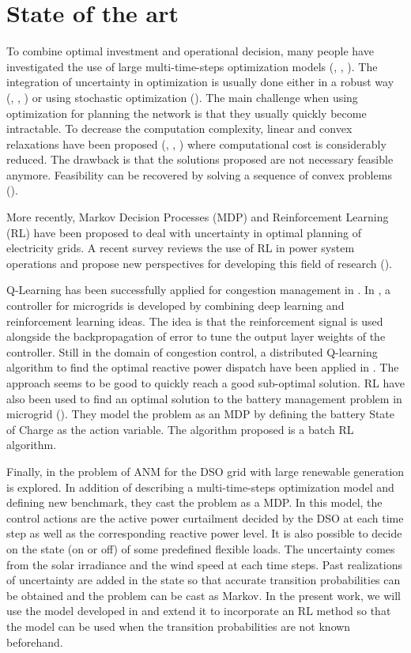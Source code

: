 \section{State of the art}
\label{sec:stateart}

To combine optimal investment and operational decision, many people have investigated the use of large multi-time-steps optimization models (\cite{zonal_int}, \cite{Baker2012OptimalIO}, \cite{paolone}).
The integration of uncertainty in optimization is usually done either in a robust way (\cite{LorcaSun}, \cite{adaptative}, \cite{BM2}) or using stochastic optimization (\cite{Oren}).
The main challenge when using optimization for planning the network is that they usually quickly become intractable.
To decrease the computation complexity, linear and convex relaxations have been proposed (\cite{Farivar_Relax1}, \cite{Farivar_Relax2}, \cite{BM1}) where computational cost is considerably reduced.
The drawback is that the solutions proposed are not necessary feasible anymore.
Feasibility can be recovered by solving a sequence of convex problems (\cite{Nali}).

More recently, Markov Decision Processes (MDP) and Reinforcement Learning (RL) have been proposed to deal with uncertainty in optimal planning of electricity grids.
A recent survey reviews the use of RL in power system operations and propose new perspectives for developing this field of research (\cite{RLSurvey}).

Q-Learning has been successfully applied for congestion management in \cite{ZARRABIAN2016179}.
In \cite{fuzzy}, a controller for microgrids is developed by combining deep learning and reinforcement learning ideas.
The idea is that the reinforcement signal is used alongside the backpropagation of error to tune the output layer weights of the controller.
Still in the domain of congestion control, a distributed Q-learning algorithm to find the optimal reactive power dispatch have been applied in \cite{volt_control}.
The approach seems to be good to quickly reach a good sub-optimal solution.
RL have also been used to find an optimal solution to the battery management problem in microgrid (\cite{Battery}).
They model the problem as an MDP by defining the battery State of Charge as the action variable.
The algorithm proposed is a batch RL algorithm.

Finally, in \cite{Gemine} the problem of ANM for the DSO grid with large renewable generation is explored.
In addition of describing a multi-time-steps optimization model and defining new benchmark, they cast the problem as a MDP.
In this model, the control actions are the active power curtailment decided by the DSO at each time step as well as the corresponding reactive power level.
It is also possible to decide on the state (on or off) of some predefined flexible loads.
The uncertainty comes from the solar irradiance and the wind speed at each time steps.
Past realizations of uncertainty are added in the state so that accurate transition probabilities can be obtained and the problem can be cast as Markov.
In the present work, we will use the model developed in \cite{Gemine} and extend it to incorporate an RL method so that the model can be used when the transition probabilities are not known beforehand.
